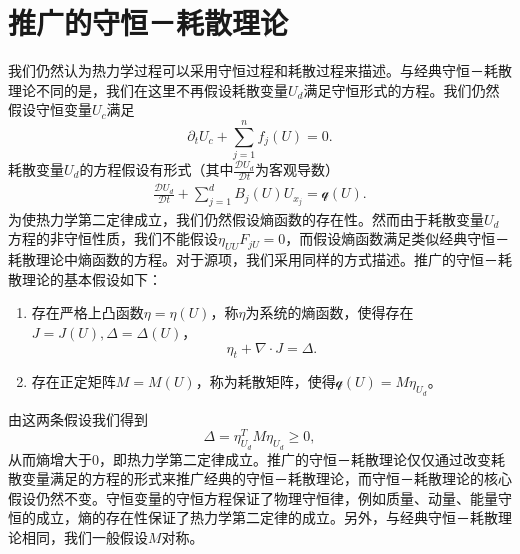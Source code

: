 
\section{推广的守恒－耗散理论}
我们仍然认为热力学过程可以采用守恒过程和耗散过程来描述。与经典守恒－耗散理论不同的是，我们在这里不再假设耗散变量$U_d$满足守恒形式的方程。我们仍然假设守恒变量$U_c$满足
\begin{equation*}
	\partial_t U_c + \sum_{j=1}^n f_j(U) = 0.
\end{equation*}
耗散变量$U_d$的方程假设有形式（其中$\frac{\mathcal{D} U_d}{\mathcal{D} t}$为客观导数）
\begin{eqnarray*}
	\frac{\mathcal{D} U_d}{\mathcal{D} t} + \sum_{j=1}^d B_{j}(U)U_{x_j} = \mathcal{q}(U).
\end{eqnarray*}
为使热力学第二定律成立，我们仍然假设熵函数的存在性。然而由于耗散变量$U_d$方程的非守恒性质，我们不能假设$\eta_{UU}F_{jU} = 0$，而假设熵函数满足类似经典守恒－耗散理论中熵函数的方程。对于源项，我们采用同样的方式描述。推广的守恒－耗散理论的基本假设如下：
\begin{enumerate}
		\item 存在严格上凸函数$\eta = \eta (U)$，称$\eta$为系统的熵函数，使得存在$J=J(U),\Delta = \Delta(U)$，
		\begin{equation}
			\eta_t + \nabla \cdot J = \Delta.
		\end{equation}
		\item 存在正定矩阵$M = M(U)$，称为耗散矩阵，使得$\mathcal{q}(U) = M \eta_{U_d}$。
	\end{enumerate}
	由这两条假设我们得到
	\begin{equation*}
		\Delta = \eta_{U_d}^T M \eta_{U_d} \ge 0,
	\end{equation*}
从而熵增大于0，即热力学第二定律成立。推广的守恒－耗散理论仅仅通过改变耗散变量满足的方程的形式来推广经典的守恒－耗散理论，而守恒－耗散理论的核心假设仍然不变。守恒变量的守恒方程保证了物理守恒律，例如质量、动量、能量守恒的成立，熵的存在性保证了热力学第二定律的成立。另外，与经典守恒－耗散理论相同，我们一般假设$M$对称。


